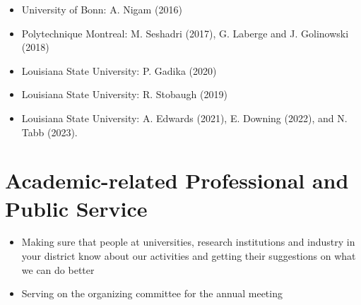 \documentclass[11pt,a4paper,sans]{moderncv}
\begin{document}
\begin{itemize}[leftmargin=4cm]
\item University of Bonn: A. Nigam (2016)
\item Polytechnique Montreal:  M. Seshadri (2017), G. Laberge and J. Golinowski (2018)
\item Louisiana State University: P. Gadika (2020)
\end{itemize}

\begin{itemize}[leftmargin=4cm]
\item Louisiana State University: R. Stobaugh (2019)
\end{itemize}

\begin{itemize}[leftmargin=4cm]
\item Louisiana State University: A. Edwards (2021), E. Downing (2022), and N. Tabb (2023).
\end{itemize}


\section{Academic-related Professional and Public Service}

\begin{itemize}[leftmargin=4cm]
\item Making sure that people at universities, research institutions and industry in your district know
  about our activities and getting their suggestions on what we can do better
\item Serving on the organizing committee for the annual meeting
\end{itemize}
\end{document}
